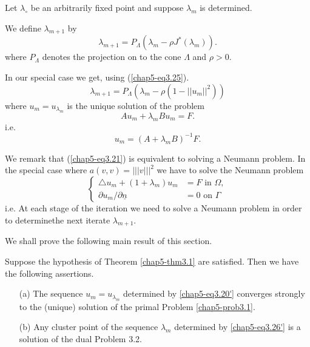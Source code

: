 \medskip
{} Let $\lambda_{\circ}$ be an arbitrarily fixed point and suppose $\lambda_{m}$ is determined.

We define $\lambda_{m+1}$ by
\begin{equation*}
\lambda_{m+1} = P_{\Lambda} (\lambda_{m} - \rho J^{*}(\lambda_{m})).\tag{3.26}\label{chap5-eq3.26}
\end{equation*}
where $P_{\Lambda}$ denotes the projection on to the cone $\Lambda$ and $\rho > 0$.

In our special case we get, using (\ref{chap5-eq3.25}).
\begin{equation*}
\lambda_{m+1} = P_{\Lambda}(\lambda_{m} - \rho(1 - ||u_{m}||^{2}))\tag*{$(3.26)'$}\label{chap5-eq3.26'}
\end{equation*}
where $u_{m} = u_{\lambda_{m}}$ is the unique solution of the problem
\begin{equation*}
Au_{m} + \lambda_{m} Bu_{m} = F.\tag*{$(3.20)'$}\label{chap5-eq3.20'}
\end{equation*}
i.e. 
\begin{equation*}
u_{m} = (A + \lambda_{m} B)^{-1} F.\tag*{$(3.21)'$}\label{chap5-eq3.21'}
\end{equation*}

We remark that (\ref{chap5-eq3.21}) is equivalent to solving a Neumann problem. In the special case where $a(v, v) = |||v|||^{2}$ we have to solve the Neumann problem
\begin{equation*}
\begin{cases}
\triangle u_{m} + (1 + \lambda_{m}) u_{m} & = F \text{ in } \Omega,\\
\partial u_{m} / \partial \underline{n} & = 0 \text{ on } \Gamma\tag*{$(3.20)''$}\label{chap5-eq3.20''}
\end{cases}
\end{equation*}
i.e. At each stage of the iteration we need to solve a Neumann problem in order to determine\pageoriginale the next iterate $\lambda_{m+1}$.

We shall prove the following main result of this section.

\begin{theorem}\label{chap5-thm3.3}
Suppose the hypothesis of Theorem \ref{chap5-thm3.1} are satisfied. Then we have the following assertions.
\begin{enumerate}
\item[(a)] The sequence $u_{m} = u_{\lambda_{m}}$ determined by \ref{chap5-eq3.20'} converges strongly to the (unique) solution of the primal Problem \ref{chap5-prob3.1}.

\item[(b)] Any cluster point of the sequence $\lambda_{m}$ determined by \ref{chap5-eq3.26'} is a solution of the dual Problem 3.2.
\end{enumerate}
\end{theorem}

